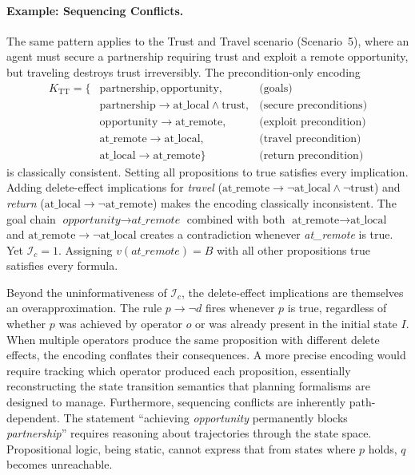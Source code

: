 \paragraph{Example: Sequencing Conflicts.} The same pattern applies to the Trust and Tra\-vel scenario (Scenario~5), where an agent must secure a partnership requiring trust and exploit a remote opportunity, but traveling destroys trust irreversibly. The precondition-only encoding
\begin{align*}
    K_{\text{TT}} = \{ & \text{partnership}, \text{opportunity},                             & \text{(goals)}                \\
                       & \text{partnership} \rightarrow \text{at\_local} \land \text{trust}, & \text{(secure preconditions)} \\
                       & \text{opportunity} \rightarrow \text{at\_remote},                   & \text{(exploit precondition)} \\
                       & \text{at\_remote} \rightarrow \text{at\_local},                     & \text{(travel precondition)}  \\
                       & \text{at\_local} \rightarrow \text{at\_remote} \}                   & \text{(return precondition)}
\end{align*}
is classically consistent. Setting all propositions to true satisfies every implication. Adding delete-effect implications for \textit{travel} ($\text{at\_remote} \rightarrow \neg\text{at\_local} \land \neg\text{trust}$) and \textit{return} ($\text{at\_local} \rightarrow \neg\text{at\_remote}$) makes the encoding classically inconsistent. The goal chain $\textit{opportunity} \rightarrow \textit{at\_remote}$ combined with both $\text{at\_remote} \rightarrow \text{at\_local}$ and $\text{at\_remote} \rightarrow \neg\text{at\_local}$ creates a contradiction whenever \textit{at\_remote} is true. Yet \mbox{$\mathcal{I}_c = 1$}. Assigning $v(\textit{at\_remote}) = B$ with all other propositions true satisfies every formula.

Beyond the uninformativeness of $\mathcal{I}_c$, the delete-effect implications are themselves an overapproximation. The rule $p \rightarrow \neg d$ fires whenever $p$ is true, regardless of whether $p$ was achieved by operator $o$ or was already present in the initial state $I$. When multiple operators produce the same proposition with different delete effects, the encoding conflates their consequences. A more precise encoding would require tracking which operator produced each proposition, essentially reconstructing the state transition semantics that planning formalisms are designed to manage. Furthermore, sequencing conflicts are inherently path-dependent. The statement ``achieving \textit{opportunity} permanently blocks \textit{partnership}'' requires reasoning about trajectories through the state space. Propositional logic, being static, cannot express that from states where $p$ holds, $q$ becomes unreachable.

